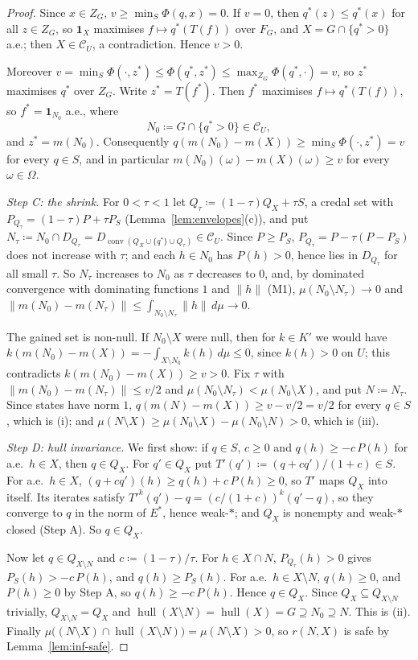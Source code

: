 \documentclass[11pt]{article}
\newcommand{\one}{\mathbf{1}}
\newcommand{\CC}{\mathcal{C}}
\newcommand{\hull}{\operatorname{hull}}
\DeclareMathOperator{\conv}{conv}
\theoremstyle{plain}
\theoremstyle{definition}
\theoremstyle{remark}
\begin{document}
\begin{proof}
Since $x\in Z_G$, $v\ge\min_S\Phi(q,x)=0$. If $v=0$, then $q^\ast(z)\le q^\ast(x)$ for
all $z\in Z_G$, so $\one_X$ maximises $f\mapsto q^\ast(T(f))$ over $F_G$, and $X=G\cap
\{q^\ast>0\}$ a.e.; then $X\in\CC_U$, a contradiction. Hence $v>0$.

Moreover $v=\min_S\Phi(\cdot,z^\ast)\le\Phi(q^\ast,z^\ast)\le\max_{Z_G}\Phi(q^\ast,\cdot)=
v$, so $z^\ast$ maximises $q^\ast$ over $Z_G$. Write $z^\ast=T(f^\ast)$. Then $f^\ast$
maximises $f\mapsto q^\ast(T(f))$, so $f^\ast=\one_{N_0}$ a.e., where
\[
  N_0\coloneqq G\cap\{q^\ast>0\}\in\CC_U,
\]
and $z^\ast=m(N_0)$. Consequently $q(m(N_0)-m(X))\ge\min_S\Phi(\cdot,z^\ast)=v$ for every
$q\in S$, and in particular $m(N_0)(\omega)-m(X)(\omega)\ge v$ for every $\omega\in\Omega$.

\emph{Step C: the shrink.} For $0<\tau<1$ let $Q_\tau\coloneqq(1-\tau)Q_X+\tau S$, a
credal set with $P_{Q_\tau}=(1-\tau)P+\tau P_S$ (Lemma~\ref{lem:envelopes}(c)), and put
$N_\tau\coloneqq N_0\cap D_{Q_\tau}=D_{\conv(Q_X\cup\{q^\ast\}\cup Q_\tau)}\in\CC_U$.
Since $P\ge P_S$, $P_{Q_\tau}=P-\tau(P-P_S)$ does not increase with $\tau$; and each
$h\in N_0$ has $P(h)>0$, hence lies in $D_{Q_\tau}$ for all small $\tau$. So $N_\tau$
increases to $N_0$ as $\tau$ decreases to $0$, and, by dominated convergence with
dominating functions $1$ and $\|h\|$ (M1), $\mu(N_0\setminus N_\tau)\to0$ and $\|m(N_0)-
m(N_\tau)\|\le\int_{N_0\setminus N_\tau}\|h\|\,d\mu\to0$.

The gained set is non-null. If $N_0\setminus X$ were null, then for $k\in K'$ we would
have $k(m(N_0)-m(X))=-\int_{X\setminus N_0}k(h)\,d\mu\le0$, since $k(h)>0$ on $U$; this
contradicts $k(m(N_0)-m(X))\ge v>0$. Fix $\tau$ with $\|m(N_0)-m(N_\tau)\|\le v/2$ and
$\mu(N_0\setminus N_\tau)<\mu(N_0\setminus X)$, and put $N\coloneqq N_\tau$. Since states
have norm $1$, $q(m(N)-m(X))\ge v-v/2=v/2$ for every $q\in S$, which is (i); and
$\mu(N\setminus X)\ge\mu(N_0\setminus X)-\mu(N_0\setminus N)>0$, which is (iii).

\emph{Step D: hull invariance.} We first show: if $q\in S$, $c\ge0$ and $q(h)\ge-c\,P(h)$
for a.e.\ $h\in X$, then $q\in Q_X$. For $q'\in Q_X$ put $T'(q')\coloneqq(q+cq')/(1+c)\in
S$. For a.e.\ $h\in X$, $(q+cq')(h)\ge q(h)+c\,P(h)\ge0$, so $T'$ maps $Q_X$ into itself.
Its iterates satisfy $T'^k(q')-q=(c/(1+c))^k(q'-q)$, so they converge to $q$ in the norm
of $E^\ast$, hence weak-$\ast$; and $Q_X$ is nonempty and weak-$\ast$ closed (Step A).
So $q\in Q_X$.

Now let $q\in Q_{X\setminus N}$ and $c\coloneqq(1-\tau)/\tau$. For $h\in X\cap N$,
$P_{Q_\tau}(h)>0$ gives $P_S(h)>-c\,P(h)$, and $q(h)\ge P_S(h)$. For a.e.\ $h\in
X\setminus N$, $q(h)\ge0$, and $P(h)\ge0$ by Step A, so $q(h)\ge-c\,P(h)$. Hence $q\in
Q_X$. Since $Q_X\subseteq Q_{X\setminus N}$ trivially, $Q_{X\setminus N}=Q_X$ and
$\hull(X\setminus N)=\hull(X)=G\supseteq N_0\supseteq N$. This is (ii). Finally
$\mu\bigl((N\setminus X)\cap\hull(X\setminus N)\bigr)=\mu(N\setminus X)>0$, so $r(N,X)$
is safe by Lemma~\ref{lem:inf-safe}.
\end{proof}
\end{document}
